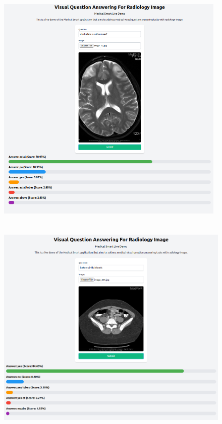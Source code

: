   \begin{figure}[H]
    \centering
    \includegraphics[width=\textwidth, height=11cm]{image/lampiran/radiologi-3.png}
  \end{figure}

  \begin{figure}[H]
    \centering
    \includegraphics[width=\textwidth, height=11cm]{image/lampiran/radiologi-4.png}
  \end{figure}



